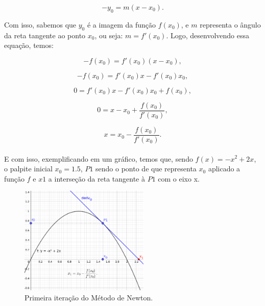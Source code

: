 \begin{equation}
    -y_0=m(x-x_0).
\end{equation}

Com isso, sabemos que $y_0$ é a imagem da função $f(x_0)$, e $m$ representa o
ângulo da reta tangente ao ponto $x_0$, ou seja: $m=f'(x_0)$. Logo,
desenvolvendo essa equação, temos:

\begin{equation}
    -f(x_0) = f'(x_0)(x-x_0),
\end{equation}

\begin{equation}
    -f(x_0) = f'(x_0)x - f'(x_0)x_0,
\end{equation}

\begin{equation}
    0 = f'(x_0)x - f'(x_0)x_0+f(x_0),
\end{equation}

\begin{equation}
    0 = x - x_0 + \frac{f(x_0)}{f'(x_0)},
\end{equation}

\begin{equation}
    x = x_0 - \frac {f(x_0)}{f'(x_0)}.
\end{equation}\\

E com isso, exemplificando em um gráfico, temos que, sendo $f(x)=-x^2+2x$, o
palpite inicial $x_0=1.5$, $P1$ sendo o ponto de que representa $x_0$ aplicado
a função $f$ e $x1$ a interseção da reta tangente à $P1$ com o eixo x.

\begin{figure}[ht]
    \includegraphics[width=0.55\textwidth]
      {src/MetodoNewton_grafico_1.png}
    \centering
    \caption{
      \centering
      Primeira iteração do Método de Newton.
    }
    \label{MetodoNewton_grafico_1}
\end{figure}


